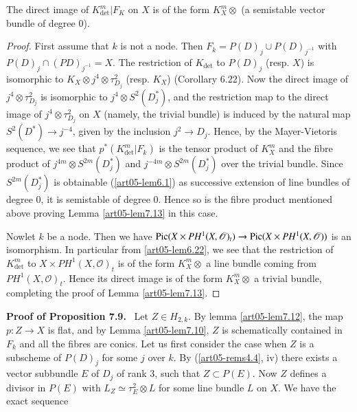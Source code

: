 \begin{lemma}\label{art05-lem7.13}
The direct image of $K^{m}_{\det}|F_{K}$ on $X$ is of the form
$K^{m}_{X}\otimes$ (a semistable vector bundle of degree $0$).
\end{lemma}

\begin{proof}
First assume that $k$ is not a node. Then $F_{k}=P(D)_{j}\cup
P(D)_{j^{-1}}$ with $P(D)_{j}\cap (PD)_{j^{-1}}=X$. The restriction of
$K_{\det}$ to $P(D)_{j}$ (resp. $X$) is isomorphic to $K_{X}\otimes
j^{4}\otimes \tau^{2}_{D_{j}}$ (resp. $K_{X}$) (Corollary 6.22). Now
the direct image of $j^{4}\otimes \tau^{2}_{D_{j}}$ is isomorphic to
$j^{4}\otimes S^{2}(D^{*}_{j})$, and the restriction map to the direct
image of $j^{4}\otimes \tau^{2}_{D_{j}}$ on $X$ (namely, the trivial
bundle) is induced by the natural map $S^{2}(D^{*})\to j^{-4}$, given
by the inclusion $j^{2}\to D_{j}$. Hence, by the Mayer-Vietoris
sequence, we see that $p^{*}(K^{m}_{\det}|F_{k})$ is the tensor
product of $K^{m}_{X}$ and the fibre product of $j^{4m}\otimes
S^{2m}(D^{*}_{j})$ and $j^{-4m}\otimes S^{2m}(D^{*}_{j})$ over the
trivial bundle. Since $S^{2m}(D^{*}_{j})$ is obtainable
(\ref{art05-lem6.1}) as successive extension of line bundles of degree
0, it is semistable of degree 0. Hence so is the fibre product
mentioned above proving Lemma \ref{art05-lem7.13} in this case.


Now\pageoriginale let $k$ be a node. Then we have $\operatorname{Pic}(X\times
PH^{1}(X,\mathscr{O})_{t})\to \operatorname{Pic}(X\times PH^{1}(X,\mathscr{O}))$ is
an isomorphism. In particular from \ref{art05-lem6.22}, we see that
the restriction of $K^{m}_{\det}$ to $X\times
PH^{1}(X,\mathscr{O})_{t}$ is of the form $K^{m}_{X}\otimes$ a line
bundle coming from $PH^{1}(X,\mathscr{O})_{t}$. Hence its direct image
is of the form $K^{m}_{X}\otimes$ a trivial bundle, completing the
proof of Lemma \ref{art05-lem7.13}.

\end{proof}
\medskip
\noindent
{\bf Proof of Proposition 7.9.}~
Let $Z\in H_{2,k}$. By lemma \ref{art05-lem7.12}, the map $p:Z\to X$
is flat, and by Lemma \ref{art05-lem7.10}, $Z$ is schematically
contained in $F_{k}$ and all the fibres are conics. Let us first
consider the case when $Z$ is a subscheme of $P(D)_{j}$ for some $j$
over $k$. By (\ref{art05-rems4.4}, iv) there exists a vector subbundle
$E$ of $D_{j}$ of rank 3, such that $Z\subset P(E)$. Now $Z$ defines a
divisor in $P(E)$ with $L_{Z}\simeq \tau^{2}_{E}\otimes L$ for some
line bundle $L$ on $X$. We have the exact sequence
